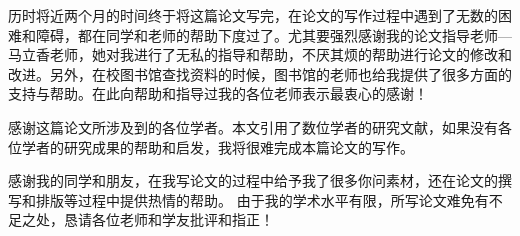
历时将近两个月的时间终于将这篇论文写完，在论文的写作过程中遇到了无数的困难和障碍，都在同学和老师的帮助下度过了。尤其要强烈感谢我的论文指导老师—马立香老师，她对我进行了无私的指导和帮助，不厌其烦的帮助进行论文的修改和改进。另外，在校图书馆查找资料的时候，图书馆的老师也给我提供了很多方面的支持与帮助。在此向帮助和指导过我的各位老师表示最衷心的感谢！

感谢这篇论文所涉及到的各位学者。本文引用了数位学者的研究文献，如果没有各位学者的研究成果的帮助和启发，我将很难完成本篇论文的写作。

感谢我的同学和朋友，在我写论文的过程中给予我了很多你问素材，还在论文的撰写和排版等过程中提供热情的帮助。
由于我的学术水平有限，所写论文难免有不足之处，恳请各位老师和学友批评和指正！
